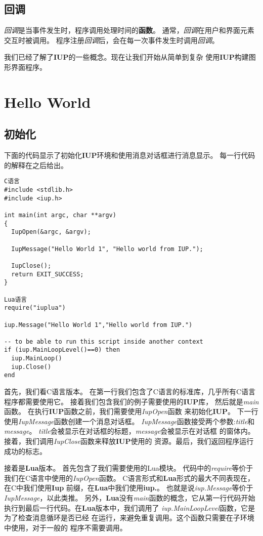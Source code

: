 \documentclass{ctexart}
\begin{document}
\subsection{回调}

\emph{回调}是当事件发生时，程序调用处理时间的\textbf{函数}。
通常，\emph{回调}在用户和界面元素交互时被调用。
程序注册\emph{回调}后，会在每一次事件发生时调用\emph{回调}。

我们已经了解了\textbf{IUP}的一些概念。现在让我们开始从简单到复杂
使用\textbf{IUP}构建图形界面程序。

\section{Hello World}

\subsection{初始化}

下面的代码显示了初始化\textbf{IUP}环境和使用消息对话框进行消息显示。
每一行代码的解释在之后给出。

\lstset{language=C}
\begin{lstlisting}
C语言
#include <stdlib.h>
#include <iup.h>

int main(int argc, char **argv)
{
  IupOpen(&argc, &argv);
  
  IupMessage("Hello World 1", "Hello world from IUP.");
  
  IupClose();
  return EXIT_SUCCESS;
}

Lua语言
require("iuplua")

iup.Message("Hello World 1","Hello world from IUP.")

-- to be able to run this script inside another context
if (iup.MainLoopLevel()==0) then
  iup.MainLoop()
  iup.Close()
end
\end{lstlisting}

首先，我们看C语言版本。
在第一行我们包含了C语言的标准库，几乎所有C语言程序都需要使用它。
接着我们包含我们的例子需要使用的\textbf{IUP}库，
然后就是\emph{main}函数。
在执行\textbf{IUP}函数之前，我们需要使用\emph{IupOpen}函数
来初始化\textbf{IUP}。
下一行使用\emph{IupMessage}函数创建一个消息对话框。
\emph{IupMessage}函数接受两个参数:\emph{title}和\emph{message}。
\emph{title}会被显示在对话框的标题，\emph{message}会被显示在对话框
的窗体内。接着，我们调用\emph{IupClose}函数来释放\textbf{IUP}使用的
资源。最后，我们返回程序运行成功的标志。

接着是\textbf{Lua}版本。
首先包含了我们需要使用的Lua模块。
代码中的\emph{require}等价于我们在C语言中使用的\emph{IupOpen}函数。
C语言形式和\textbf{Lua}形式的最大不同表现在，在C中我们使用\textbf{Iup}
前缀，在\textbf{Lua}中我们使用\textbf{iup.}。
也就是说\emph{iup.Message}等价于\emph{IupMessage}，以此类推。
另外，\textbf{Lua}没有\emph{main}函数的概念，它从第一行代码开始
执行到最后一行代码。在\textbf{Lua}版本中，我们调用了
\emph{iup.MainLoopLevel}函数，它是为了检查消息循环是否已经
在运行，来避免重复调用。这个函数只需要在子环境中使用，对于一般的
程序不需要调用。
\end{document}
